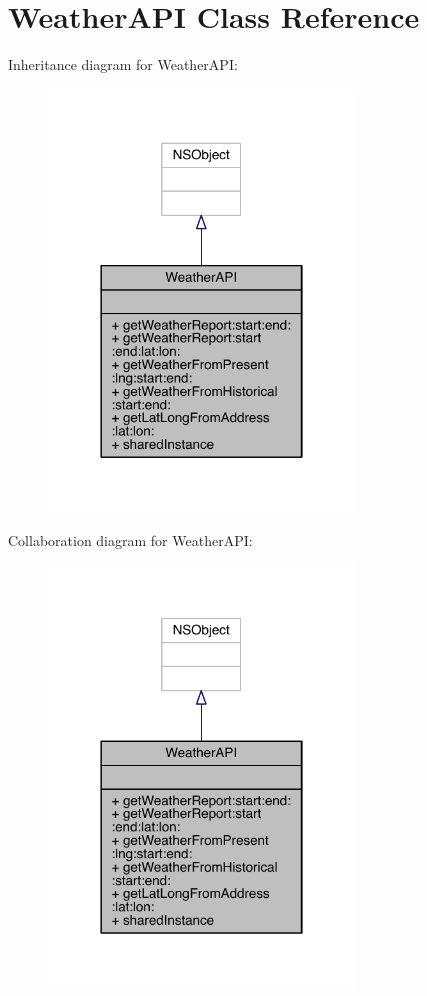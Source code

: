 \hypertarget{interface_weather_a_p_i}{\section{Weather\-A\-P\-I Class Reference}
\label{interface_weather_a_p_i}
}


Inheritance diagram for Weather\-A\-P\-I\-:\nopagebreak
\begin{figure}[H]
\begin{center}
\leavevmode
\includegraphics[width=230pt]{interface_weather_a_p_i__inherit__graph}
\end{center}
\end{figure}


Collaboration diagram for Weather\-A\-P\-I\-:\nopagebreak
\begin{figure}[H]
\begin{center}
\leavevmode
\includegraphics[width=230pt]{interface_weather_a_p_i__coll__graph}
\end{center}
\end{figure}
